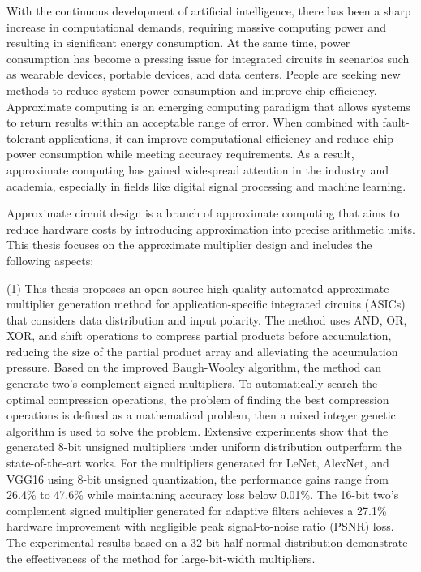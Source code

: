 \begin{abstract*}
      With the continuous development of artificial intelligence, there has been a sharp increase in computational demands, requiring massive computing power and resulting in significant energy consumption. At the same time, power consumption has become a pressing issue for integrated circuits in scenarios such as wearable devices, portable devices, and data centers. People are seeking new methods to reduce system power consumption and improve chip efficiency.
      Approximate computing is an emerging computing paradigm that allows systems to return results within an acceptable range of error. When combined with fault-tolerant applications, it can improve computational efficiency and reduce chip power consumption while meeting accuracy requirements. As a result, approximate computing has gained widespread attention in the industry and academia, especially in fields like digital signal processing and machine learning.
    
      Approximate circuit design is a branch of approximate computing that aims to reduce hardware costs by introducing approximation into precise arithmetic units. This thesis focuses on the approximate multiplier design and includes the following aspects:
    
      (1) This thesis proposes an open-source high-quality automated approximate multiplier generation method for application-specific integrated circuits (ASICs) that considers data distribution and input polarity. The method uses AND, OR, XOR, and shift operations to compress partial products before accumulation, reducing the size of the partial product array and alleviating the accumulation pressure. Based on the improved Baugh-Wooley algorithm, the method can generate two's complement signed multipliers. To automatically search the optimal compression operations, the problem of finding the best compression operations is defined as a mathematical problem, then a mixed integer genetic algorithm is used to solve the problem. Extensive experiments show that the generated 8-bit unsigned multipliers under uniform distribution outperform the state-of-the-art works. For the multipliers generated for LeNet, AlexNet, and VGG16 using 8-bit unsigned quantization, the performance gains range from 26.4\% to 47.6\% while maintaining accuracy loss below 0.01\%. The 16-bit two's complement signed multiplier generated for adaptive filters achieves a 27.1\% hardware improvement with negligible peak signal-to-noise ratio (PSNR) loss. The experimental results based on a 32-bit half-normal distribution demonstrate the effectiveness of the method for large-bit-width multipliers.
    

\end{abstract*}
